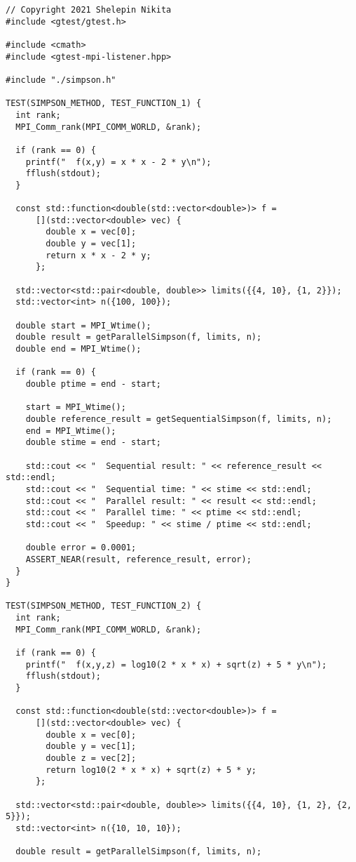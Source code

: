 \documentclass{report}
\begin{document}
\begin{lstlisting}
// Copyright 2021 Shelepin Nikita
#include <gtest/gtest.h>

#include <cmath>
#include <gtest-mpi-listener.hpp>

#include "./simpson.h"

TEST(SIMPSON_METHOD, TEST_FUNCTION_1) {
  int rank;
  MPI_Comm_rank(MPI_COMM_WORLD, &rank);

  if (rank == 0) {
    printf("  f(x,y) = x * x - 2 * y\n");
    fflush(stdout);
  }

  const std::function<double(std::vector<double>)> f =
      [](std::vector<double> vec) {
        double x = vec[0];
        double y = vec[1];
        return x * x - 2 * y;
      };

  std::vector<std::pair<double, double>> limits({{4, 10}, {1, 2}});
  std::vector<int> n({100, 100});

  double start = MPI_Wtime();
  double result = getParallelSimpson(f, limits, n);
  double end = MPI_Wtime();

  if (rank == 0) {
    double ptime = end - start;

    start = MPI_Wtime();
    double reference_result = getSequentialSimpson(f, limits, n);
    end = MPI_Wtime();
    double stime = end - start;

    std::cout << "  Sequential result: " << reference_result << std::endl;
    std::cout << "  Sequential time: " << stime << std::endl;
    std::cout << "  Parallel result: " << result << std::endl;
    std::cout << "  Parallel time: " << ptime << std::endl;
    std::cout << "  Speedup: " << stime / ptime << std::endl;

    double error = 0.0001;
    ASSERT_NEAR(result, reference_result, error);
  }
}

TEST(SIMPSON_METHOD, TEST_FUNCTION_2) {
  int rank;
  MPI_Comm_rank(MPI_COMM_WORLD, &rank);

  if (rank == 0) {
    printf("  f(x,y,z) = log10(2 * x * x) + sqrt(z) + 5 * y\n");
    fflush(stdout);
  }

  const std::function<double(std::vector<double>)> f =
      [](std::vector<double> vec) {
        double x = vec[0];
        double y = vec[1];
        double z = vec[2];
        return log10(2 * x * x) + sqrt(z) + 5 * y;
      };

  std::vector<std::pair<double, double>> limits({{4, 10}, {1, 2}, {2, 5}});
  std::vector<int> n({10, 10, 10});

  double result = getParallelSimpson(f, limits, n);


\end{lstlisting}
\end{document}
